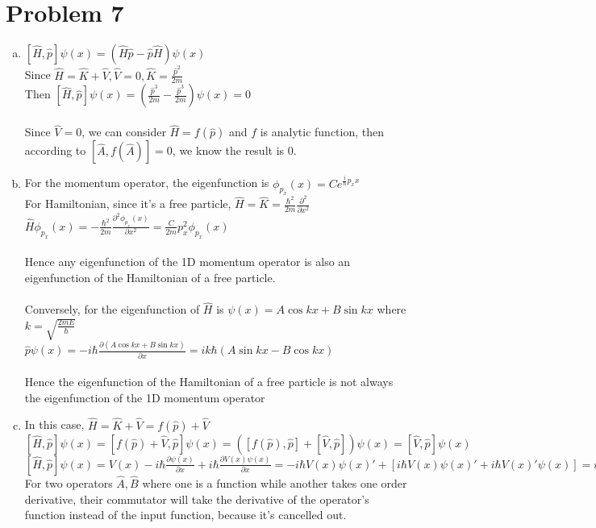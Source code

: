 \documentclass[a4paper]{article}
\begin{document}
\section{Problem 7}
\begin{enumerate}[(a)]
    \item $[\hat{H},\hat{p}]\psi(x)=(\hat{H}\hat{p}-\hat{p}\hat{H})\psi(x)$
    \\Since $\hat{H}=\hat{K}+\hat{V},\hat{V}=0,\hat{K}=\frac{\hat{p}^2}{2m}$
    \\Then $[\hat{H},\hat{p}]\psi(x)=(\frac{\hat{p}^3}{2m}-\frac{\hat{p}^3}{2m})\psi(x)=0$
    \\\\Since $\hat{V}=0$, we can consider $\hat{H}=f(\hat{p})$ and $f$ is analytic function, then according to $[\hat{A},f(\hat{A})]=0$, we know the result is 0.
    \item For the momentum operator, the eigenfunction is $\phi_{p_x}(x)=Ce^{\frac{i}{\hbar}p_xx}$
    \\For Hamiltonian, since it's a free particle, $\hat{H}=\hat{K}=\frac{\hbar^2}{2m}\frac{\partial^2}{\partial x^2}$
    \\$\hat{H}\phi_{p_x}(x)=-\frac{\hbar^2}{2m}\frac{\partial^2\phi_{p_x}(x)}{\partial x^2}=\frac{C}{2m}p_x^2\phi_{p_x}(x)$
    \\\\Hence any eigenfunction of the 1D momentum operator is also an eigenfunction of the Hamiltonian of a free particle.
    \\\\Conversely, for the eigenfunction of $\hat{H}$ is $\psi(x)=A\cos kx+B\sin kx$ where $k=\sqrt{\frac{2mE}{\hbar}}$
    \\$\hat{p}\psi(x)=-i\hbar\frac{\partial(A\cos kx+B\sin kx)}{\partial x}=ik\hbar(A\sin kx-B\cos kx)$
    \\\\Hence the eigenfunction of the Hamiltonian of a free particle is not always the eigenfunction of the 1D momentum operator
    \item In this case, $\hat{H}=\hat{K}+\hat{V}=f(\hat{p})+\hat{V}$
    \\$[\hat{H},\hat{p}]\psi(x)=[f(\hat{p})+\hat{V},\hat{p}]\psi(x)=([f(\hat{p}),\hat{p}]+[\hat{V},\hat{p}])\psi(x)=[\hat{V},\hat{p}]\psi(x)$
    \\$[\hat{H},\hat{p}]\psi(x)=V(x)-i\hbar\frac{\partial\psi(x)}{\partial x}+i\hbar\frac{\partial V(x)\psi(x)}{\partial x}=-i\hbar V(x)\psi(x)'+[i\hbar V(x)\psi(x)'+i\hbar V(x)'\psi(x)]=i\hbar V(x)'\psi(x)$
    \\For two operators $\hat{A},\hat{B}$ where one is a function while another takes one order derivative, their commutator will take the derivative of the operator's function instead of the input function, because it's cancelled out. 
\end{enumerate}
\end{document}
